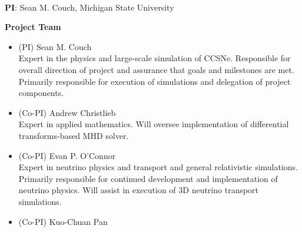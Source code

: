 \documentclass[12pt,letterpaper,english]{article}
\begin{document}
\setlength{\parindent}{0in}


\pagestyle{fancy}
\renewcommand{\headrulewidth}{0.0pt}

\begin{center} \textbf{\doctitle{}} \\
\end{center}

\textbf{PI}:
Sean M. Couch, Michigan State University \\
\medskip

\textbf{Project Team}

\begin{itemize}

\item (PI) Sean M. Couch \\
Expert in the physics and large-scale simulation of CCSNe.  Responsible for overall direction of project and assurance that goals
and milestones are met.  Primarily responsible for execution of
simulations and delegation of project components.\\
\item (Co-PI) Andrew Christlieb \\
Expert in applied mathematics. Will oversee implementation of differential transforms-based MHD solver.
\item (Co-PI) Evan P. O'Connor \\
Expert in neutrino physics and transport and general relativistic
simulations.  Primarily responsible for continued development and
implementation of neutrino physics.  Will assist in execution of 3D neutrino transport simulations.  \\
\item (Co-PI) Kuo-Chuan Pan \\

\end{itemize}
\end{document}
